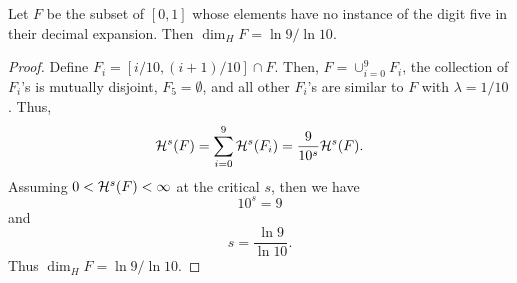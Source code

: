 \begin{example}
	Let $F$ be the subset of $[0,1]$ whose elements have no instance of the digit five in their decimal expansion.
	Then $\dim_H F=\ln 9/\ln 10$.
\end{example}
\begin{proof}
	Define $F_i=[i/10,(i+1)/10]\cap F$.
	Then, $F=\cup_{i=0}^9 F_i$, the collection of $F_i$'s is mutually disjoint, $F_5=\emptyset$, and all other $F_i$'s are similar to $F$ with $\lambda=1/10$.
	Thus,
	\[
		\mathcal{H}^s(F)=\sum_{i=0}^9 \mathcal{H}^s(F_i)=\frac{9}{10^s}\mathcal{H}^s(F).
	\]
	Assuming $0 < \mathcal{H}^s(F) < \infty$ at the critical $s$, then we have
	\[
		10^s=9
	\]
	and
	\[
		s=\frac{\ln9}{\ln10}.
	\]
	Thus $\dim_H F=\ln 9 /\ln 10$.
\end{proof}
